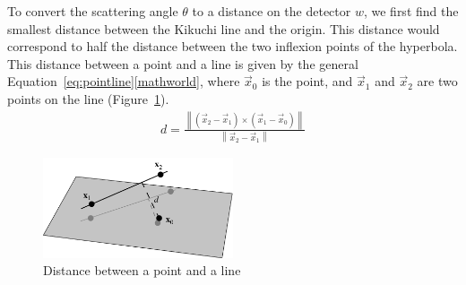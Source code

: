\documentclass[letterpaper]{article}
\newcommand{\norm}[1]{\left\|#1\right\|}
\begin{document}
	To convert the scattering angle $\theta$ to a distance on the detector $w$, we first find the smallest distance between the Kikuchi line and the origin. 
	This distance would correspond to half the distance between the two inflexion points of the hyperbola.
	This distance between a point and a line is given by the general Equation~\ref{eq:pointline}\ref{mathworld}, where $\vec{x}_0$ is the point, and $\vec{x}_1$ and $\vec{x}_2$ are two points on the line (Figure~\ref{fig:pointline}).
	\begin{eqnarray}
		d = \frac{\norm{(\vec{x}_2-\vec{x}_1) \times (\vec{x}_1-\vec{x}_0)}}{\norm{\vec{x}_2-\vec{x}_1}}
		\label{eq:pointline}
	\end{eqnarray}
	
	\begin{figure}
		\centering
		\includegraphics[width=0.5\textwidth]{figures/pointline}
		\caption{Distance between a point and a line}
		\label{fig:pointline}
	\end{figure}
	
\end{document}
